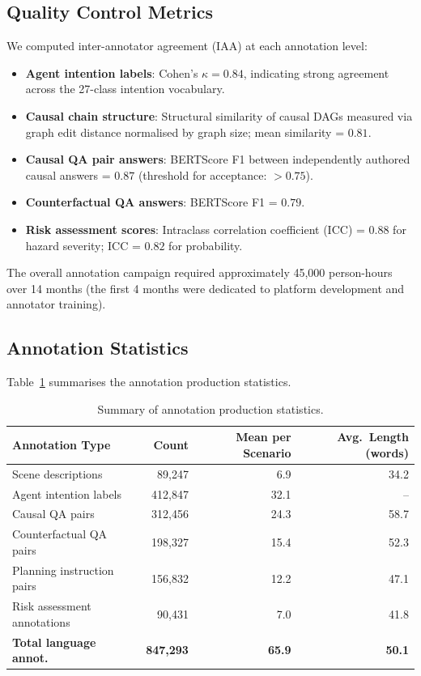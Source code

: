 \subsection{Quality Control Metrics}
\label{ssec:ann_quality}

We computed inter-annotator agreement (IAA) at each annotation level:

\begin{itemize}[leftmargin=2em, noitemsep]
  \item \textbf{Agent intention labels}: Cohen's $\kappa = 0.84$, indicating strong
        agreement across the 27-class intention vocabulary.
  \item \textbf{Causal chain structure}: Structural similarity of causal DAGs measured
        via graph edit distance normalised by graph size; mean similarity = $0.81$.
  \item \textbf{Causal QA pair answers}: BERTScore F1 between independently authored
        causal answers = $0.87$ (threshold for acceptance: $> 0.75$).
  \item \textbf{Counterfactual QA answers}: BERTScore F1 = $0.79$.
  \item \textbf{Risk assessment scores}: Intraclass correlation coefficient (ICC) = $0.88$
        for hazard severity; ICC = $0.82$ for probability.
\end{itemize}

The overall annotation campaign required approximately 45,000 person-hours over
14 months (the first 4 months were dedicated to platform development and annotator training).

\subsection{Annotation Statistics}
\label{ssec:ann_stats}

Table~\ref{tab:annotation_stats} summarises the annotation production statistics.

\begin{table}[htbp]
  \centering
  \caption{Summary of \lucid{} annotation production statistics.}
  \label{tab:annotation_stats}
  \small
  \begin{tabular}{lrrr}
    \toprule
    \textbf{Annotation Type} & \textbf{Count} & \textbf{Mean per Scenario} & \textbf{Avg.\ Length (words)} \\
    \midrule
    Scene descriptions           & 89,247  & 6.9  & 34.2 \\
    Agent intention labels       & 412,847 & 32.1 & --   \\
    Causal QA pairs              & 312,456 & 24.3 & 58.7 \\
    Counterfactual QA pairs      & 198,327 & 15.4 & 52.3 \\
    Planning instruction pairs   & 156,832 & 12.2 & 47.1 \\
    Risk assessment annotations  & 90,431  & 7.0  & 41.8 \\
    \midrule
    \textbf{Total language annot.}& \textbf{847,293} & \textbf{65.9} & \textbf{50.1} \\
    \bottomrule
  \end{tabular}
\end{table}
